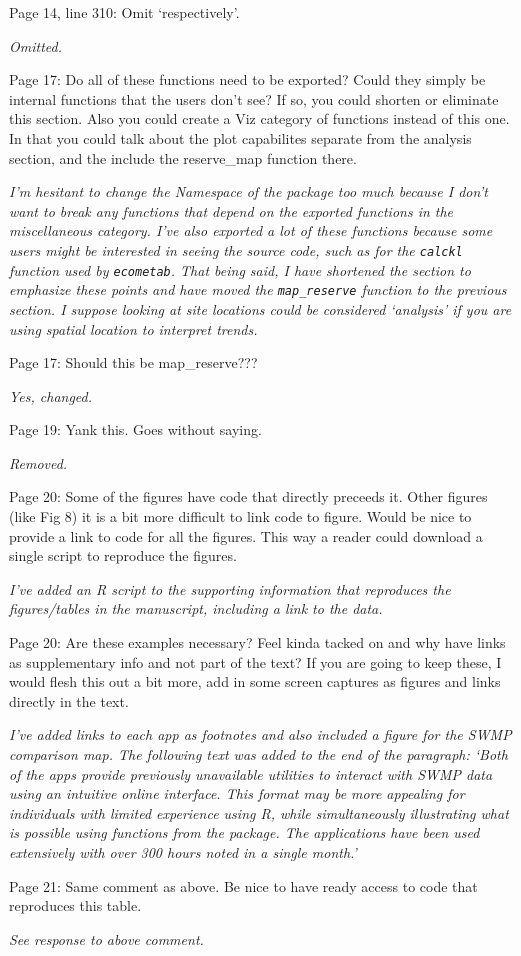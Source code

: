\documentclass[letterpaper,12pt]{article}\usepackage[]{graphicx}\usepackage[]{color}
\begin{document}
Page 14, line 310: Omit `respectively'.

{\it Omitted.}

Page 17: Do all of these functions need to be exported? Could they simply be internal functions that the users don't see? If so, you could shorten or eliminate this section. Also you could create a Viz category of functions instead of this one. In that you could talk about the plot capabilites separate from the analysis section, and the include the reserve\_map function there.

{\it I'm hesitant to change the Namespace of the package too much because I don't want to break any functions that depend on the exported functions in the miscellaneous category.  I've also exported a lot of these functions because some users might be interested in seeing the source code, such as for the \texttt{calckl} function used by \texttt{ecometab}.  That being said, I have shortened the section to emphasize these points and have moved the \texttt{map\_reserve} function to the previous section.  I suppose looking at site locations could be considered `analysis' if you are using spatial location to interpret trends.}

Page 17: Should this be map\_reserve???

{\it Yes, changed.}

Page 19: Yank this. Goes without saying.

{\it Removed.}

Page 20: Some of the figures have code that directly preceeds it. Other figures (like Fig 8) it is a bit more difficult to link code to figure. Would be nice to provide a link to code for all the figures. This way a reader could download a single script to reproduce the figures.

{\it I've added an R script to the supporting information that reproduces the figures/tables in the manuscript, including a link to the data.}

Page 20: Are these examples necessary? Feel kinda tacked on and why have links as supplementary info and not part of the text? If you are going to keep these, I would flesh this out a bit more, add in some screen captures as figures and links directly in the text.

{\it I've added links to each app as footnotes and also included a figure for the SWMP comparison map.  The following text was added to the end of the paragraph: `Both of the apps provide previously unavailable utilities to interact with SWMP data using an intuitive online interface.  This format may be more appealing for individuals with limited experience using R, while simultaneously illustrating what is possible using functions from the package.  The applications have been used extensively with over 300 hours noted in a single month.'}

Page 21: Same comment as above. Be nice to have ready access to code that reproduces this table.

{\it See response to above comment.}
\end{document}
